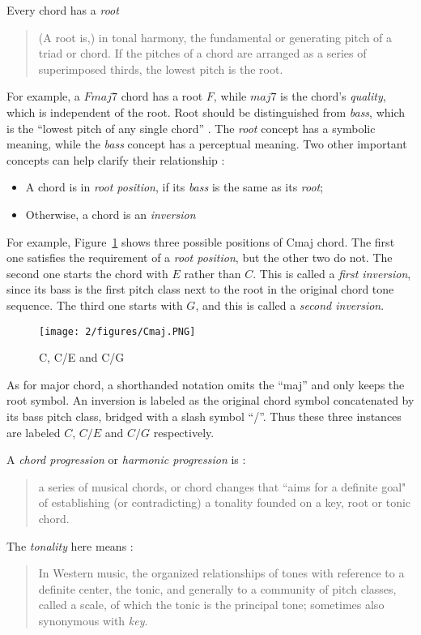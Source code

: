 Every chord has a {\it root} \cite{randel1999harvard}
\begin{quote}
(A root is,) in tonal harmony, the fundamental or generating pitch of a triad or chord. If the pitches of a chord are arranged as a series of superimposed thirds, the lowest pitch is the root.
\end{quote}
For example, a $Fmaj7$ chord has a root $F$, while $maj7$ is the chord's {\it quality}, which is independent of the root. Root should be distinguished from {\it bass}, which is the ``lowest pitch of any single chord'' \cite{randel1999harvard}. The {\it root} concept has a symbolic meaning, while the {\it bass} concept has a perceptual meaning. Two other important concepts can help clarify their relationship \cite{randel1999harvard}:
\begin{itemize}
\item A chord is in {\it root position}, if its {\it bass} is the same as its {\it root};
\item Otherwise, a chord is an {\it inversion}
\end{itemize}
For example, Figure~\ref{fig:2-cmaj} shows three possible positions of Cmaj chord. The first one satisfies the requirement of a {\it root position}, but the other two do not. The second one starts the chord with $E$ rather than $C$. This is called a {\it first inversion}, since its bass is the first pitch class next to the root in the original chord tone sequence. The third one starts with $G$, and this is called a {\it second inversion}.
\begin{figure}[htb]
\centering
\texttt{[image: 2/figures/Cmaj.PNG]}
\caption{C, C/E and C/G}
\label{fig:2-cmaj}
\end{figure}
As for major chord, a shorthanded notation omits the ``maj'' and only keeps the root symbol. An inversion is labeled as the original chord symbol concatenated by its bass pitch class, bridged with a slash symbol ``/''. Thus these three instances are labeled $C$, $C/E$ and $C/G$ respectively.

A {\it chord progression} or {\it harmonic progression} is \cite{schonberg1989structural}:
\begin{quote}
a series of musical chords, or chord changes that ``aims for a definite goal" of establishing (or contradicting) a tonality founded on a key, root or tonic chord.
\end{quote}
The {\it tonality} here means \cite{randel1999harvard}:
\begin{quote}
In Western music, the organized relationships of tones with reference to a definite center, the tonic, and generally to a community of pitch classes, called a scale, of which the tonic is the principal tone; sometimes also synonymous with {\it key}.
\end{quote}

